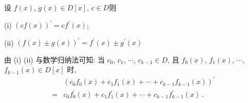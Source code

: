 \begin{proposition}
    设 $f(x)$, $g(x) \in D[x]$, $c \in D$\period 则

    (i) $(cf(x))^{\prime} = c f^{\prime} (x)$;

    (ii) $(f(x) \pm g(x))^{\prime} = f^{\prime} (x) \pm g^{\prime} (x)$\period

    由 (i) (ii) 与数学归纳法可知: 当 $c_0$, $c_1$, $\cdots$, $c_{k-1} \in D$, 且 $f_0 (x)$, $f_1 (x)$, $\cdots$, $f_{k-1} (x) \in D[x]$ 时,
    \begin{align*}
             & (c_0 f_0(x) + c_1 f_1(x) + \cdots + c_{k-1} f_{k-1}(x))^{\prime}                         \\
        = {} & c_0 f^{\prime}_0(x) + c_1 f^{\prime}_1(x) + \cdots + c_{k-1} f^{\prime}_{k-1}(x) \period
    \end{align*}
\end{proposition}

